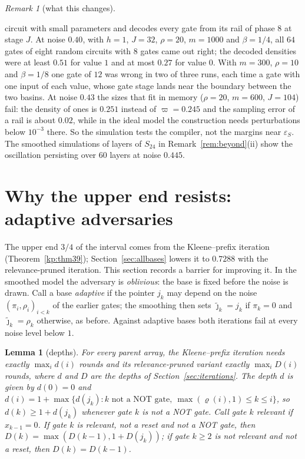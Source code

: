 \documentclass[11pt]{amsart}
\newtheorem{lemma}[theorem]{Lemma}
\theoremstyle{definition}
\theoremstyle{remark}
\newtheorem{remark}[theorem]{Remark}
\newcommand{\eps}{\varepsilon}
\newcommand{\jt}{\tilde{\jmath}}
\begin{document}
\begin{remark}[what this changes]
\begin{enumerate}[label=(\roman*),leftmargin=2.4em]
circuit with small parameters and decodes every gate from its rail of phase $8$ at stage $J$. At
noise $0.40$, with $h=1$, $J=32$, $\rho=20$, $m=1000$ and $\beta=1/4$, all $64$ gates of eight
random circuits with $8$ gates came out right; the decoded densities were at least $0.51$ for value
$1$ and at most $0.27$ for value $0$. With $m=300$, $\rho=10$ and $\beta=1/8$ one gate of $12$ was
wrong in two of three runs, each time a gate with one input of each value, whose gate stage lands
near the boundary between the two basins. At noise $0.43$ the sizes that fit in memory
($\rho=20$, $m=600$, $J=104$) fail: the density of ones is $0.251$ instead of $\varpi=0.245$ and the
sampling error of a rail is about $0.02$, while in the ideal model the construction needs
perturbations below $10^{-3}$ there. So the simulation tests the compiler, not the margins near
$\eps_S$. The smoothed simulations of layers of $S_{24}$ in Remark~\ref{rem:beyond}(ii) show the
oscillation persisting over $60$ layers at noise $0.445$.
\end{enumerate}
\end{remark}

\section{Why the upper end resists: adaptive adversaries}\label{sec:adaptive}

The upper end $3/4$ of the interval comes from the Kleene--prefix iteration (Theorem~\ref{kp:thm39});
Section~\ref{sec:allbases} lowers it to $0.7288$ with the relevance-pruned iteration. This
section records a barrier for improving it. In the smoothed model the adversary is
\emph{oblivious}: the base is fixed before the noise is drawn. Call a base \emph{adaptive} if the
pointer $j_k$ may depend on the noise $(\pi_i,\rho_i)_{i<k}$ of the earlier gates; the smoothing
then sets $\jt_k=j_k$ if $\pi_k=0$ and $\jt_k=\rho_k$ otherwise, as before. Against adaptive bases
both iterations fail at every noise level below $1$.

\begin{lemma}[depths]\label{fact:depths}
For every parent array, the Kleene--prefix iteration needs exactly $\max_id(i)$ rounds and its
relevance-pruned variant exactly $\max_iD(i)$ rounds, where $d$ and $D$ are the depths of
Section~\ref{sec:iterations}. The depth $d$ is given by $d(0)=0$ and
$d(i)=1+\max\{d(j_k):k\text{ not a NOT gate},\ \max(\varrho(i),1)\le k\le i\}$, so
$d(k)\ge1+d(j_k)$ whenever gate $k$ is not a NOT gate. Call gate $k$ \emph{relevant} if
$x_{k-1}=0$. If gate $k$ is relevant, not a reset and not a NOT gate, then
$D(k)=\max(D(k-1),1+D(j_k))$; if gate $k\ge2$ is not relevant and not a reset, then $D(k)=D(k-1)$.
\end{lemma}
\end{document}
